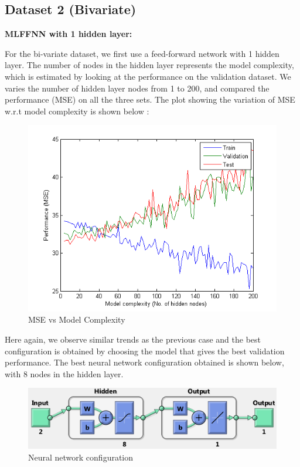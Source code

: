 \documentclass{article}
\begin{document}
\subsection{Dataset 2 (Bivariate)}

\textbf{MLFFNN with 1 hidden layer:}

\begin{flushleft}
For the bi-variate dataset, we first use a feed-forward network with 1 hidden layer. The number of nodes in the hidden layer represents the model complexity, which is estimated by looking at the performance on the validation dataset. We varies the number of hidden layer nodes from 1 to 200, and compared the performance (MSE) on all the three sets. The plot showing the variation of MSE w.r.t model complexity is shown below :

\end{flushleft}


\begin{figure}[H]
\centering
\includegraphics[width=0.8\linewidth]{Regression/bivariate/1layer_mse.png}
\caption{MSE vs Model Complexity}
\end{figure}

Here again, we observe similar trends as the previous case and the best configuration is obtained by choosing the model that gives the best validation performance.
The best neural network configuration obtained is shown below, with 8 nodes in the hidden layer.

\begin{figure}[H]
\centering
\includegraphics[width=0.6\linewidth]{Regression/bivariate/net_config.png}
\caption{Neural network configuration}
\end{figure}
\end{document}
